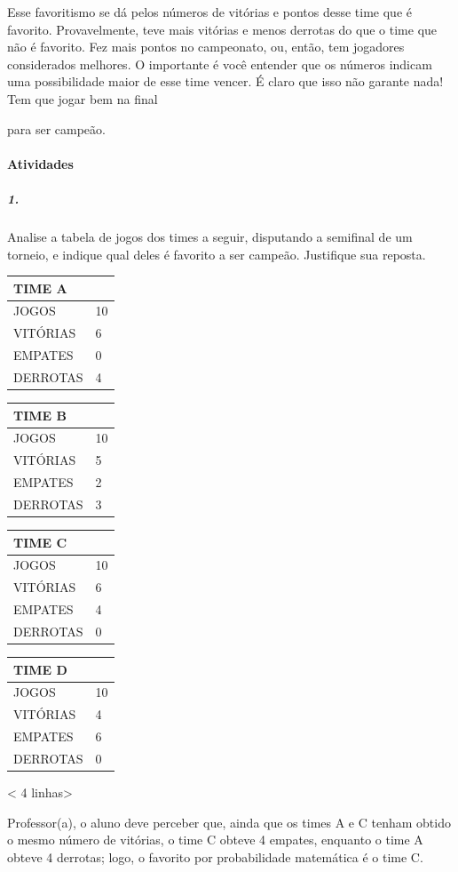 Esse favoritismo se dá pelos números de vitórias e
pontos desse time que é favorito. Provavelmente, teve mais vitórias e
menos derrotas do que o time que não é favorito. Fez mais pontos no
campeonato, ou, então, tem jogadores considerados melhores. O importante é você
entender que os números indicam uma possibilidade maior de esse time
vencer. É claro que isso não garante nada! Tem que jogar bem na final

para ser campeão.

\paragraph{Atividades }\label{atividades-5}

\subparagraph{1.}\label{section-68}

Analise a tabela de jogos dos times a seguir, disputando a semifinal de um
torneio, e indique qual deles é favorito a ser campeão. Justifique sua reposta.

\begin{longtable}[]{@{}ll@{}}
\toprule
TIME A\tabularnewline
\midrule
\endhead
JOGOS & 10\tabularnewline
VITÓRIAS & 6\tabularnewline
EMPATES & 0\tabularnewline
DERROTAS & 4\tabularnewline
\bottomrule
\end{longtable}

\begin{longtable}[]{@{}ll@{}}
\toprule
TIME B\tabularnewline
\midrule
\endhead
JOGOS & 10\tabularnewline
VITÓRIAS & 5\tabularnewline
EMPATES & 2\tabularnewline
DERROTAS & 3\tabularnewline
\bottomrule
\end{longtable}

\begin{longtable}[]{@{}ll@{}}
\toprule
TIME C\tabularnewline
\midrule
\endhead
JOGOS & 10\tabularnewline
VITÓRIAS & 6\tabularnewline
EMPATES & 4\tabularnewline
DERROTAS & 0\tabularnewline
\bottomrule
\end{longtable}

\begin{longtable}[]{@{}ll@{}}
\toprule
TIME D\tabularnewline
\midrule
\endhead
JOGOS & 10\tabularnewline
VITÓRIAS & 4\tabularnewline
EMPATES & 6\tabularnewline
DERROTAS & 0\tabularnewline
\bottomrule
\end{longtable}

\textless{} 4 linhas\textgreater{}

Professor(a), o aluno deve perceber que, ainda que os times A e C tenham
obtido o mesmo número de vitórias, o time C obteve 4 empates, enquanto o
time A obteve 4 derrotas; logo, o favorito por probabilidade matemática é o time C.

